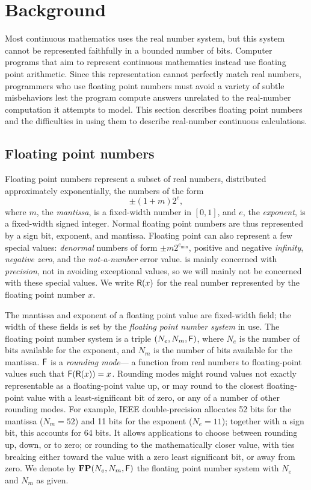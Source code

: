 \documentclass{paper.tex}[subfiles]
\begin{document}
\section{Background}

Most continuous mathematics uses the real number system,
  but this system cannot be represented faithfully
  in a bounded number of bits.
Computer programs that aim to represent continuous mathematics
  instead use floating point arithmetic.
Since this representation cannot perfectly match real numbers,
  programmers who use floating point numbers
  must avoid a variety of subtle misbehaviors
  lest the program compute answers
  unrelated to the real-number computation it attempts to model.
This section describes floating point numbers
  and the difficulties in using them to describe
  real-number continuous calculations.

\subsection{Floating point numbers}

Floating point numbers represent a subset of real numbers,
  distributed approximately exponentially, the numbers of the form
\[ \pm (1 + m) 2^e, \]
  where $m$, the \emph{mantissa}, is a fixed-width number in $[0, 1]$,
  and $e$, the \emph{exponent}, is a fixed-width signed integer.
Normal floating point numbers are thus represented by
  a sign bit, exponent, and mantissa.
Floating point can also represent a few special values:
  \emph{denormal} numbers of form $\pm m 2^{e_{\text{min}}}$,
  positive and negative \emph{infinity}, \emph{negative zero},
  and the \emph{not-a-number} error value.
\casio is mainly concerned with \emph{precision},
  not in avoiding exceptional values,
  so we will mainly not be concerned with these special values.
We write $\mathsf{R}(x)$ for the real number represented
  by the floating point number $x$.

The mantissa and exponent of a floating point value
  are fixed-width field; the width of these fields
  is set by the \emph{floating point number system} in use.
The floating point number system is a triple $(N_e, N_m, \mathsf{F})$,
  where $N_e$ is the number of bits available for the exponent,
  and $N_m$ is the number of bits available for the mantissa.
$\mathsf{F}$ is a \emph{rounding mode}---%
  a function from real numbers to floating-point values
  such that $\mathsf{F}(\mathsf{R}(x)) = x$.
Rounding modes might round values
  not exactly representable as a floating-point value
  up, or may round to the closest floating-point value
  with a least-significant bit of zero,
  or any of a number of other rounding modes.
For example, IEEE double-precision allocates
  52 bits for the mantissa ($N_m = 52$)
  and 11 bits for the exponent ($N_e = 11$);
  together with a sign bit, this accounts for 64 bits.
It allows applications to choose between rounding up, down, or to zero;
  or rounding to the mathematically closer value, with ties breaking
  either toward the value with a zero least significant bit,
  or away from zero.
We denote by $\mathbf{FP}(N_e, N_m, \mathsf{F})$
  the floating point number system with $N_e$ and $N_m$ as given.
\end{document}
